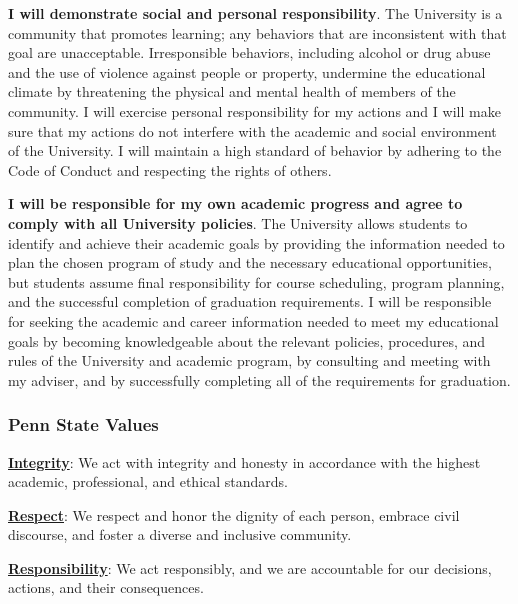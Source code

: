 \documentclass[
  letterpaper,
  DIV=11,
  numbers=noendperiod]{scrartcl}
\begin{document}
\textbf{I will demonstrate social and personal responsibility}. The
University is a community that promotes learning; any behaviors that are
inconsistent with that goal are unacceptable. Irresponsible behaviors,
including alcohol or drug abuse and the use of violence against people
or property, undermine the educational climate by threatening the
physical and mental health of members of the community. I will exercise
personal responsibility for my actions and I will make sure that my
actions do not interfere with the academic and social environment of the
University. I will maintain a high standard of behavior by adhering to
the Code of Conduct and respecting the rights of others.

\textbf{I will be responsible for my own academic progress and agree to
comply with all University policies}. The University allows students to
identify and achieve their academic goals by providing the information
needed to plan the chosen program of study and the necessary educational
opportunities, but students assume final responsibility for course
scheduling, program planning, and the successful completion of
graduation requirements. I will be responsible for seeking the academic
and career information needed to meet my educational goals by becoming
knowledgeable about the relevant policies, procedures, and rules of the
University and academic program, by consulting and meeting with my
adviser, and by successfully completing all of the requirements for
graduation.

\subsubsection*{Penn State Values}\label{psu-values}

\href{http://universityethics.psu.edu/examples-action\#integrityexamples}{\textbf{Integrity}}:
We act with integrity and honesty in accordance with the highest
academic, professional, and ethical standards.

\href{http://universityethics.psu.edu/examples-action\#respectexamples}{\textbf{Respect}}:
We respect and honor the dignity of each person, embrace civil
discourse, and foster a diverse and inclusive community.

\href{http://universityethics.psu.edu/examples-action\#responsibilityexamples}{\textbf{Responsibility}}:
We act responsibly, and we are accountable for our decisions, actions,
and their consequences.
\end{document}
